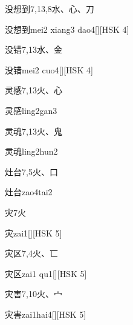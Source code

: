 \begin{entry}{没想到}{7,13,8}{⽔、⼼、⼑}
  \begin{phonetics}{没想到}{mei2 xiang3 dao4}[][HSK 4]
  \end{phonetics}
\end{entry}

\begin{entry}{没错}{7,13}{⽔、⾦}
  \begin{phonetics}{没错}{mei2 cuo4}[][HSK 4]
  \end{phonetics}
\end{entry}

\begin{entry}{灵感}{7,13}{⽕、⼼}
  \begin{phonetics}{灵感}{ling2gan3}
  \end{phonetics}
\end{entry}

\begin{entry}{灵魂}{7,13}{⽕、⿁}
  \begin{phonetics}{灵魂}{ling2hun2}
  \end{phonetics}
\end{entry}

\begin{entry}{灶台}{7,5}{⽕、⼝}
  \begin{phonetics}{灶台}{zao4tai2}
  \end{phonetics}
\end{entry}

\begin{entry}{灾}{7}{⽕}
  \begin{phonetics}{灾}{zai1}[][HSK 5]
  \end{phonetics}
\end{entry}

\begin{entry}{灾区}{7,4}{⽕、⼖}
  \begin{phonetics}{灾区}{zai1 qu1}[][HSK 5]
  \end{phonetics}
\end{entry}

\begin{entry}{灾害}{7,10}{⽕、⼧}
  \begin{phonetics}{灾害}{zai1hai4}[][HSK 5]
  \end{phonetics}
\end{entry}

